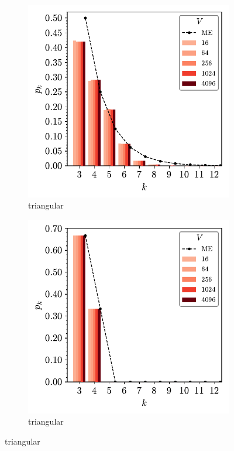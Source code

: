 \begin{figure}[bt]
     \vspace{2mm}
     \begin{subfigure}[b]{0.40\textwidth}
         \centering
         \includegraphics[width=\textwidth]{./figures/procrystals/tri4_pk.pdf}
         \caption{triangular}
         \label{fig:pro45pkc}
     \end{subfigure}
     \hspace{1cm}
      \begin{subfigure}[b]{0.40\textwidth}
         \centering
         \includegraphics[width=\textwidth]{./figures/procrystals/tri5_pk.pdf}
         \caption{triangular}
         \label{fig:pro45pkd}
     \end{subfigure}
    

\end{figure}
